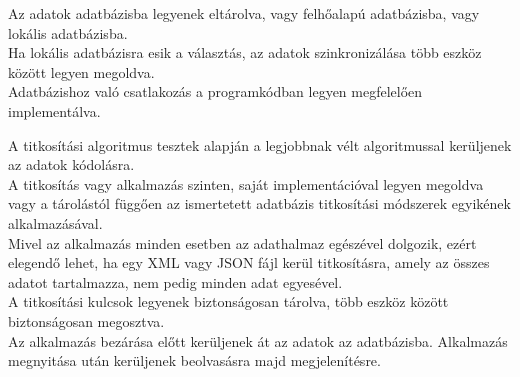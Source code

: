 Az adatok adatbázisba legyenek eltárolva, vagy felhőalapú adatbázisba, vagy lokális adatbázisba. 
\\Ha lokális adatbázisra esik a választás, az adatok szinkronizálása több eszköz között legyen megoldva.
\\Adatbázishoz való csatlakozás a programkódban legyen megfelelően implementálva.


A titkosítási algoritmus tesztek alapján a legjobbnak vélt algoritmussal kerüljenek az adatok kódolásra.
\\A titkosítás vagy alkalmazás szinten, saját implementációval legyen megoldva vagy a tárolástól függően az ismertetett adatbázis titkosítási módszerek egyikének alkalmazásával.
\\Mivel az alkalmazás minden esetben az adathalmaz egészével dolgozik, ezért elegendő lehet, ha egy XML vagy JSON fájl kerül titkosításra, amely az összes adatot tartalmazza, nem pedig minden adat egyesével.
\\A titkosítási kulcsok legyenek biztonságosan tárolva, több eszköz között biztonságosan megosztva.
\\Az alkalmazás bezárása előtt kerüljenek át az adatok az adatbázisba. Alkalmazás megnyitása után kerüljenek beolvasásra majd megjelenítésre.
